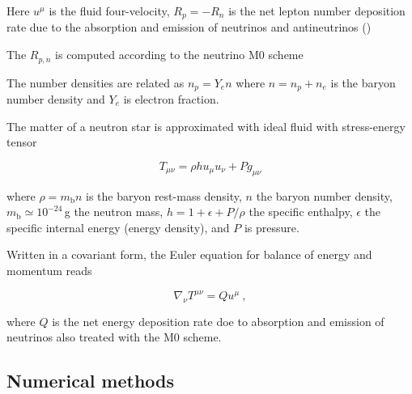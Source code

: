 Here $u^{\mu}$ is the fluid four-velocity, $R_p = -R_n$ is the net
lepton number deposition rate due to the absorption and emission of neutrinos 
and antineutrinos ()

The $R_{p,n}$ is computed according to the neutrino M0 scheme \cite{Radice:2016dwd,Radice:2018pdn}

The number densities are related as $n_p=Y_e n$ where $n = n_p + n_e$ is the baryon 
number density and $Y_e$ is electron fraction.

The matter of a neutron star is approximated with ideal fluid with stress-energy tensor

\begin{equation}
T_{\mu\nu} = \rho h u_{\mu} u_{\nu} + Pg_{\mu\nu}
\end{equation}

where $\rho=m_{\text{b}} n$ is the baryon rest-mass density, 
$n$ the baryon number density, $m_{\text{b}} \simeq 10^{-24}\,$g 
the neutron mass, 
$h=1+\epsilon + P/\rho$ the specific enthalpy, 
$\epsilon$ the specific internal energy (energy density),
and $P$ is  pressure.

Written in a covariant form, the Euler equation for balance of energy and momentum reads

\begin{equation}
\label{eq:wthc:euler}
\nabla_\nu T^{\mu\nu} = Q u^{\mu} \ ,
\end{equation}


where $Q$ is the net energy deposition rate doe to absorption
and emission of neutrinos also treated with the M0 scheme.


\subsection{Numerical methods}



